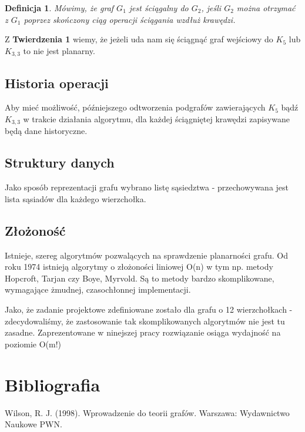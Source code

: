\documentclass[a4 122pt]{article}
\newtheorem{definicja}{Definicja}
\begin{document}
		\begin{definicja}
			Mówimy, że graf $G_1$ jest ściągalny do $G_2$, jeśli $G_2$ można otrzymać z $G_1$ poprzez skończony ciąg operacji ściągania wzdłuż krawędzi.
		\end{definicja}
		
		Z \textbf{Twierdzenia 1} wiemy, że jeżeli uda nam się ściągnąć graf wejściowy do $K_5$ lub $K_{3,3}$ to nie jest planarny. 
	
	\subsection{Historia operacji}
	
		Aby mieć możliwość, późniejszego odtworzenia podgrafów zawierających $K_5$ bądź $K_{3,3}$ w trakcie działania algorytmu, dla każdej ściągniętej krawędzi zapisywane będą dane historyczne.
	
	\subsection{Struktury danych}

		Jako sposób reprezentacji grafu wybrano listę sąsiedztwa - przechowywana jest lista sąsiadów dla każdego wierzchołka. 
	
	\subsection{Złożoność}
	
		Istnieje, szereg algorytmów pozwalących na sprawdzenie planarności grafu.
		Od roku 1974 istnieją algorytmy o złożoności liniowej O(n) w tym np. metody Hopcroft, Tarjan czy Boye, Myrvold. Są to metody bardzo skomplikowane, wymagające żmudnej, czasochłonnej implementacji.
 
		Jako, że zadanie projektowe zdefiniowane zostało dla grafu o 12 wierzchołkach - zdecydowaliśmy, że zastosowanie tak skomplikowanych algorytmów nie jest tu zasadne. 
		Zaprezentowane w ninejszej pracy rozwiązanie osiąga wydajność na poziomie O(m!)

	\section{Bibliografia}

		Wilson, R. J. (1998). Wprowadzenie do teorii grafów. Warszawa: Wydawnictwo Naukowe PWN.
\end{document}
